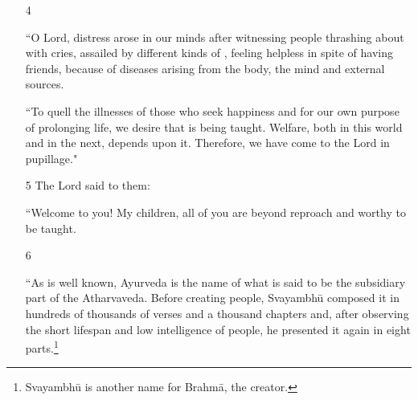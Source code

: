 \documentclass[12pt]{article}
\begin{document}
\begin{itemize}
    \item[4]

“O Lord, distress arose in our minds after witnessing people thrashing about with
cries, assailed by different kinds of , 
feeling helpless in spite 
of having friends, because of diseases arising from the body, the mind and
external sources.


    

    \let\uncertain\texttt
    
“To quell the illnesses of those who seek happiness and for our own purpose of
prolonging life, we desire  that is being
taught.  Welfare, both in this world and in
    the next, depends upon it. Therefore, we have come to the Lord in pupillage." %


\item[5] The Lord said to them:

“Welcome to you!  My children, all of you are beyond reproach and worthy 
to be taught.
   
    
    \item[6] 
%    
    
    “As is well known, Ayurveda is the name of what is said to be the subsidiary
part of the Atharvaveda.   Before creating people, Svayambhū composed it in
hundreds of thousands of verses and a thousand chapters and, after observing the
short lifespan and low intelligence of people, he presented it again in eight
parts.\footnote{Svayambhū is another name for Brahmā, the creator.}
    

\end{itemize}
\end{document}
